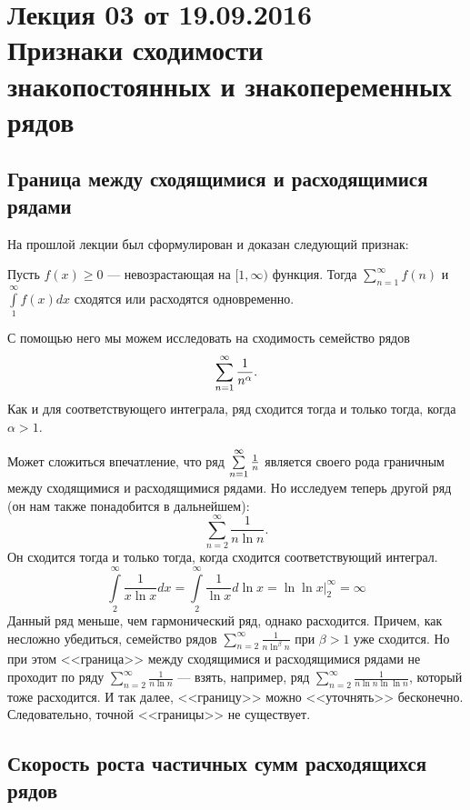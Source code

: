 \documentclass[a4paper, 12pt]{article}
\begin{document}
\pagestyle{fancy}
\section{Лекция 03 от 19.09.2016 \\Признаки сходимости знакопостоянных и знакопеременных рядов}

\subsection{Граница между сходящимися и расходящимися рядами}

На прошлой лекции был сформулирован и доказан следующий признак:
\begin{Test}

Пусть $f(x) \geqslant 0$ --- невозрастающая на $[1, \infty)$ функция. Тогда $\sum\limits_{n=1}^{\infty}f(n)$ и $\int\limits_1^{\infty}f(x)dx$ сходятся или расходятся одновременно.
\end{Test}

С помощью него мы можем исследовать на сходимость семейство рядов
$$
\sum\limits_{n=1}^{\infty} \frac{1}{n^\alpha}.
$$
Как и для соответствующего интеграла, ряд сходится тогда и только тогда, когда $\alpha > 1$.

Может сложиться впечатление, что ряд $\sum\limits_{n=1}^{\infty} \frac{1}{n}$ является своего рода граничным между сходящимися и расходящимися рядами. Но исследуем теперь другой ряд (он нам также понадобится в дальнейшем):
$$
\sum\limits_{n=2}^{\infty} \frac{1}{n\ln n}.
$$
Он сходится тогда и только тогда, когда сходится соответствующий интеграл.
$$
\int\limits_{2}^{\infty} \frac{1}{x\ln x}dx = \int\limits_{2}^{\infty} \frac{1}{\ln x} d\ln x = \ln\ln x \Big|_2^{\infty} = \infty
$$
Данный ряд меньше, чем гармонический ряд, однако расходится. Причем, как несложно убедиться, семейство рядов $\sum\limits_{n=2}^{\infty}\frac{1}{n\ln^\beta n}$ при $\beta > 1$ уже сходится. Но при этом <<граница>> между сходящимися и расходящимися рядами не проходит по ряду $\sum\limits_{n=2}^{\infty} \frac{1}{n\ln n}$ --- взять, например, ряд $\sum\limits_{n=2}^{\infty}\frac{1}{n\ln n \ln\ln n}$, который тоже расходится. И так далее, <<границу>> можно <<уточнять>> бесконечно. Следовательно, точной <<границы>> не существует.

\subsection{Скорость роста частичных сумм расходящихся рядов}
\end{document}
